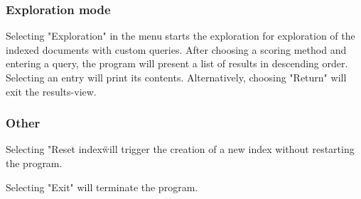 
\subsubsection{Exploration mode}

Selecting "Exploration" in the menu starts the exploration for exploration of the indexed documents with custom queries.
After choosing a scoring method and entering a query, the program will present a list of results in descending order.
Selecting an entry will print its contents.
Alternatively, choosing "Return" will exit the results-view.

\subsubsection{Other}


Selecting "Reset index\" will trigger the creation of a new index without restarting the program.

Selecting "Exit" will terminate the program.

